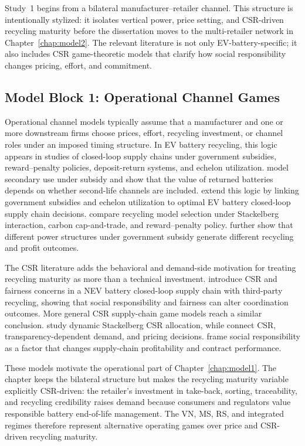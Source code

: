 Study~1 begins from a bilateral manufacturer--retailer channel. This structure is intentionally stylized: it isolates vertical power, price setting, and CSR-driven recycling maturity before the dissertation moves to the multi-retailer network in Chapter~\ref{chap:model2}. The relevant literature is not only EV-battery-specific; it also includes CSR game-theoretic models that clarify how social responsibility changes pricing, effort, and commitment.

\subsection{Model Block 1: Operational Channel Games}
\label{sec:lit_block1}

Operational channel models typically assume that a manufacturer and one or more downstream firms choose prices, effort, recycling investment, or channel roles under an imposed timing structure. In EV battery recycling, this logic appears in studies of closed-loop supply chains under government subsidies, reward--penalty policies, deposit-return systems, and echelon utilization. \cite{Gu2021} model secondary use under subsidy and show that the value of returned batteries depends on whether second-life channels are included. \cite{ZhangW2024} extend this logic by linking government subsidies and echelon utilization to optimal EV battery closed-loop supply chain decisions. \cite{Narang2024} compare recycling model selection under Stackelberg interaction, carbon cap-and-trade, and reward--penalty policy. \cite{Zeng2024} further show that different power structures under government subsidy generate different recycling and profit outcomes.

The CSR literature adds the behavioral and demand-side motivation for treating recycling maturity as more than a technical investment. \cite{ZhangLiang2023} introduce CSR and fairness concerns in a NEV battery closed-loop supply chain with third-party recycling, showing that social responsibility and fairness can alter coordination outcomes. More general CSR supply-chain game models reach a similar conclusion. \cite{Ferrara2017} study dynamic Stackelberg CSR allocation, while \cite{Khosroshahi2019} connect CSR, transparency-dependent demand, and pricing decisions. \cite{Mahdiraji2023} frame social responsibility as a factor that changes supply-chain profitability and contract performance.

These models motivate the operational part of Chapter~\ref{chap:model1}. The chapter keeps the bilateral structure but makes the recycling maturity variable explicitly CSR-driven: the retailer's investment in take-back, sorting, traceability, and recycling credibility raises demand because consumers and regulators value responsible battery end-of-life management. The VN, MS, RS, and integrated regimes therefore represent alternative operating games over price and CSR-driven recycling maturity.

